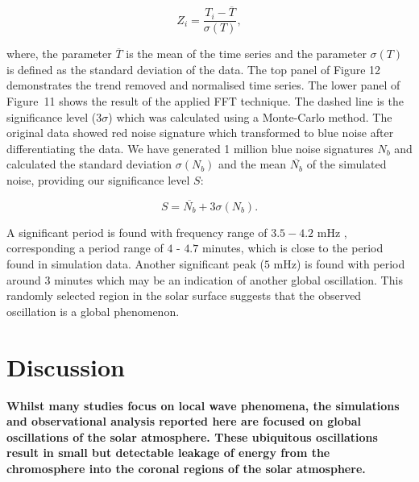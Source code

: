 \documentclass[physics,article,submit,pdftex,moreauthors]{Definitions/mdpi}
\begin{document}
\begin{equation}
	Z_{i} = \frac {T_{i} - \overline{T}}  {\sigma(T)},
	\label{z_score}
\end{equation}


where, the parameter $\overline{T}$ is the mean of the time series and the parameter $\sigma(T)$ is defined as the standard deviation of the data. The top panel of Figure 12 demonstrates the trend removed and normalised time series. The lower panel of Figure~11 shows the result of the applied FFT technique. The dashed line is the significance level ($3 \sigma$) which was calculated using a Monte-Carlo method. The original data showed red noise signature which transformed to blue noise after differentiating the data. We have generated 1 million blue noise signatures $N_{b}$ and calculated the standard deviation $\sigma(N_{b})$ and the mean $\overline{N_{b}}$ of the simulated noise, providing our significance level $S$:


\begin{equation}
    S = \overline{N_{b}} + 3 \sigma(N_{b}).
\end{equation}


A significant period is found with frequency range of $3.5-4.2$ mHz , corresponding a period range of $4$ - $4.7$ minutes, which is close to the period found in simulation data. Another significant peak ($5$ mHz) is found with period around $3$ minutes which may be an indication of another global oscillation.  This randomly selected region in the solar surface suggests that the observed oscillation is a global phenomenon.


\section{Discussion}
{\bf     Whilst many studies focus on local wave phenomena, the simulations and observational analysis reported here are focused on global oscillations of the solar atmosphere. These ubiquitous oscillations result in small but detectable leakage of energy from the chromosphere  into the coronal regions of the solar atmosphere.}
\end{document}
